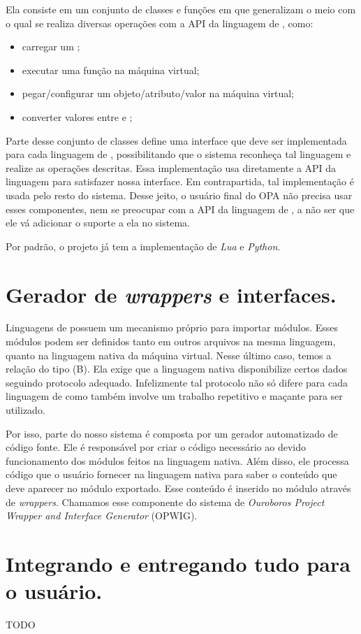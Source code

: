   Ela consiste em um conjunto de classes e funções em \CXX{} que generalizam o meio
  com o qual se realiza diversas operações com a API da linguagem de \script{}, como:
  \begin{itemize}
    \item carregar um \script{};
    \item executar uma função na máquina virtual;
    \item pegar/configurar um objeto/atributo/valor na máquina virtual;
    \item converter valores entre \CXX{} e \script{};
  \end{itemize}
  Parte desse conjunto de classes define uma interface que deve ser implementada para
  cada linguagem de \script{}, possibilitando que o sistema reconheça tal linguagem e 
  realize as operações descritas. Essa implementação usa diretamente a API da linguagem
  para satisfazer nossa interface. Em contrapartida, tal implementação é usada pelo 
  resto do sistema. Desse jeito, o usuário final do OPA não precisa usar esses 
  componentes, nem se preocupar com a API da linguagem de \script{}, a não ser que
  ele vá adicionar o suporte a ela no sistema.
  
  Por padrão, o projeto já tem a implementação de \textit{Lua} e \textit{Python}.
  
  
  
  \section{Gerador de \emph{wrappers} e interfaces.}
  \label{sec:estrutura:opwig}
  Linguagens de \script{} possuem um mecanismo próprio para importar módulos. 
  Esses módulos podem ser definidos tanto em outros arquivos na mesma linguagem,
  quanto na linguagem nativa da máquina virtual. Nesse último caso, temos a relação
  do tipo (B). Ela exige que a linguagem nativa disponibilize certos dados seguindo
  protocolo adequado. Infelizmente tal protocolo não só difere para cada linguagem 
  de \script{} como também involve um trabalho repetitivo e maçante para ser utilizado. 
  
  Por isso, parte do nosso sistema é composta por um gerador automatizado de código fonte.
  Ele é responsável por criar o código necessário ao devido funcionamento dos módulos 
  feitos na linguagem nativa. Além disso, ele processa código que o usuário fornecer na
  linguagem nativa para saber o conteúdo que deve aparecer no módulo exportado.
  Esse conteúdo é inserido no módulo através de \emph{wrappers}. Chamamos esse componente
  do sistema de \emph{Ouroboros Project Wrapper and Interface Generator} (OPWIG).
  
  
  \section{Integrando e entregando tudo para o usuário.}
  \label{sec:estrutura:integration}
  TODO
